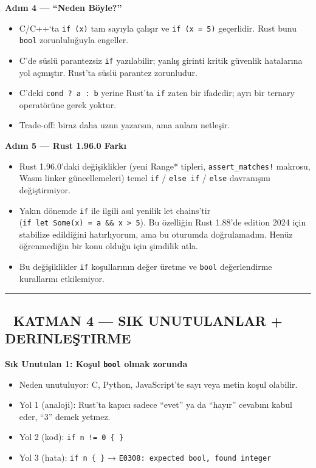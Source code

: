 \documentclass[12pt,a4paper]{article}
\begin{document}
\textbf{Adım 4 --- ``Neden Böyle?''}

\begin{itemize}
\tightlist
\item
  C/C++`ta \texttt{if\ (x)} tam sayıyla çalışır ve \texttt{if\ (x\ =\ 5)} geçerlidir. Rust bunu \texttt{bool} zorunluluğuyla engeller.
\item
  C'de süslü parantezsiz \texttt{if} yazılabilir; yanlış girinti kritik güvenlik hatalarına yol açmıştır. Rust'ta süslü parantez zorunludur.
\item
  C'deki \texttt{cond\ ?\ a\ :\ b} yerine Rust'ta \texttt{if} zaten bir ifadedir; ayrı bir ternary operatörüne gerek yoktur.
\item
  Trade-off: biraz daha uzun yazarsın, ama anlam netleşir.
\end{itemize}

\textbf{Adım 5 --- Rust 1.96.0 Farkı}

\begin{itemize}
\tightlist
\item
  Rust 1.96.0'daki değişiklikler (yeni Range* tipleri, \texttt{assert\_matches!} makrosu, Wasm linker güncellemeleri) temel \texttt{if} / \texttt{else\ if} / \texttt{else} davranışını değiştirmiyor.
\item
  Yakın dönemde \texttt{if} ile ilgili asıl yenilik let chains'tir (\texttt{if\ let\ Some(x)\ =\ a\ \&\&\ x\ \textgreater{}\ 5}). Bu özelliğin Rust 1.88'de edition 2024 için stabilize edildiğini hatırlıyorum, ama bu oturumda doğrulamadım. Henüz öğrenmediğin bir konu olduğu için şimdilik atla.
\item
  Bu değişiklikler \texttt{if} koşullarının değer üretme ve \texttt{bool} değerlendirme kurallarını etkilemiyor.
\end{itemize}

\begin{center}\rule{0.5\linewidth}{0.5pt}\end{center}

\subsection{🔴 KATMAN 4 --- SIK UNUTULANLAR + DERINLEŞTIRME}\label{katman-4-—-sik-unutulanlar-derinleştirme-6}

\textbf{Sık Unutulan 1: Koşul \texttt{bool} olmak zorunda}

\begin{itemize}
\tightlist
\item
  Neden unutuluyor: C, Python, JavaScript'te sayı veya metin koşul olabilir.
\item
  Yol 1 (analoji): Rust'ta kapıcı sadece ``evet'' ya da ``hayır'' cevabını kabul eder, ``3'' demek yetmez.
\item
  Yol 2 (kod): \texttt{if\ n\ !=\ 0\ \{\ \}}
\item
  Yol 3 (hata): \texttt{if\ n\ \{\ \}} → \texttt{E0308:\ expected\ bool,\ found\ integer}
\end{itemize}
\end{document}
